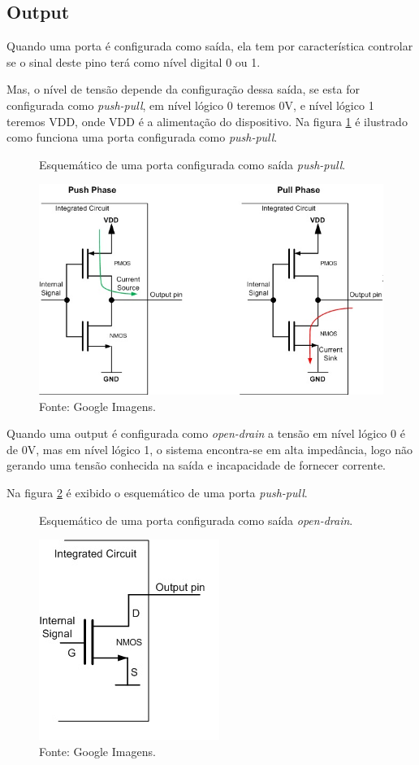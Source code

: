 \documentclass[12pt,a4paper]{report}
\begin{document}
\subsection{Output}

Quando uma porta é configurada como saída, ela tem por característica controlar se o sinal deste pino terá como nível digital 0 ou 1.

Mas, o nível de tensão depende da configuração dessa saída, se esta for configurada como \textit{push-pull}, em nível lógico 0 teremos 0V, e nível lógico 1 teremos VDD, onde VDD é a alimentação do dispositivo. Na figura \ref{fig:push_pull_schematic} é ilustrado como funciona uma porta configurada como \textit{push-pull}.

\begin{figure}[H]
    \centering
    \caption{Esquemático de uma porta configurada como saída \textit{push-pull}.}
    \includegraphics[scale=0.5]{fig/push_pull_schematic.jpg}
    \caption*{Fonte: Google Imagens.}
    \label{fig:push_pull_schematic}
\end{figure}

Quando uma output é configurada como \textit{open-drain} a tensão em nível lógico 0 é de 0V, mas em nível lógico 1, o sistema encontra-se em alta impedância, logo não gerando uma tensão conhecida na saída e incapacidade de fornecer corrente.

Na figura \ref{fig:open_drain_schematic} é exibido o esquemático de uma porta \textit{push-pull}.

\begin{figure}[H]
    \centering
    \caption{Esquemático de uma porta configurada como saída \textit{open-drain}.}
    \includegraphics[scale=0.8]{fig/open_drain_schematic.jpg}
    \caption*{Fonte: Google Imagens.}
    \label{fig:open_drain_schematic}
\end{figure}
\end{document}

